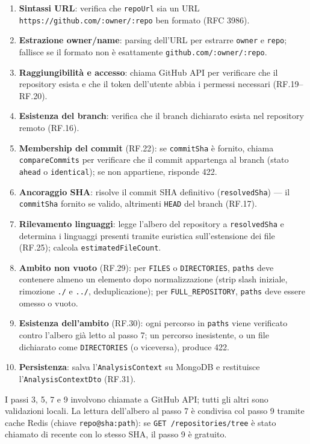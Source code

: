 \documentclass[11pt,a4paper]{article}
\begin{document}
\begin{enumerate}
    \item \textbf{Sintassi URL}: verifica che \texttt{repoUrl} sia un URL \texttt{https://github.com/:owner/:repo} ben formato (RFC 3986).
    \item \textbf{Estrazione owner/name}: parsing dell'URL per estrarre \texttt{owner} e \texttt{repo}; fallisce se il formato non è esattamente \texttt{github.com/:owner/:repo}.
    \item \textbf{Raggiungibilità e accesso}: chiama GitHub API per verificare che il repository esista e che il token dell'utente abbia i permessi necessari (RF.19--RF.20).
    \item \textbf{Esistenza del branch}: verifica che il branch dichiarato esista nel repository remoto (RF.16).
    \item \textbf{Membership del commit} (RF.22): se \texttt{commitSha} è fornito, chiama \texttt{compareCommits} per verificare che il commit appartenga al branch (stato \texttt{ahead} o \texttt{identical}); se non appartiene, risponde 422.
    \item \textbf{Ancoraggio SHA}: risolve il commit SHA definitivo (\texttt{resolvedSha}) --- il \texttt{commitSha} fornito se valido, altrimenti \texttt{HEAD} del branch (RF.17).
    \item \textbf{Rilevamento linguaggi}: legge l'albero del repository a \texttt{resolvedSha} e determina i linguaggi presenti tramite euristica sull'estensione dei file (RF.25); calcola \texttt{estimatedFileCount}.
    \item \textbf{Ambito non vuoto} (RF.29): per \texttt{FILES} o \texttt{DIRECTORIES}, \texttt{paths} deve contenere almeno un elemento dopo normalizzazione (strip slash iniziale, rimozione \texttt{./} e \texttt{../}, deduplicazione); per \texttt{FULL\_REPOSITORY}, \texttt{paths} deve essere omesso o vuoto.
    \item \textbf{Esistenza dell'ambito} (RF.30): ogni percorso in \texttt{paths} viene verificato contro l'albero già letto al passo 7; un percorso inesistente, o un file dichiarato come \texttt{DIRECTORIES} (o viceversa), produce 422.
    \item \textbf{Persistenza}: salva l'\texttt{AnalysisContext} su MongoDB e restituisce l'\texttt{AnalysisContextDto} (RF.31).
\end{enumerate}

I passi 3, 5, 7 e 9 involvono chiamate a GitHub API; tutti gli altri sono validazioni locali. La lettura dell'albero al passo 7 è condivisa col passo 9 tramite cache Redis (chiave \texttt{repo@sha:path}): se \texttt{GET /repositories/tree} è stato chiamato di recente con lo stesso SHA, il passo 9 è gratuito.
\end{document}
